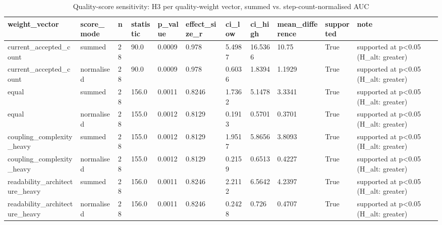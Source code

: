\begin{table}[t]
\centering
\caption{Quality-score sensitivity: H3 per quality-weight vector, summed vs. step-count-normalised AUC}
\label{tab:quality-sensitivity}
\begin{tabular}{lllllllllll}
\toprule
weight\_vector & score\_mode & n & statistic & p\_value & effect\_size\_r & ci\_low & ci\_high & mean\_difference & supported & note \\
\midrule
current\_accepted\_count & summed & 28 & 90.0 & 0.0009 & 0.978 & 5.4987 & 16.5366 & 10.75 & True & supported at p<0.05 (H\_alt: greater) \\
current\_accepted\_count & normalised & 28 & 90.0 & 0.0009 & 0.978 & 0.6036 & 1.8394 & 1.1929 & True & supported at p<0.05 (H\_alt: greater) \\
equal & summed & 28 & 156.0 & 0.0011 & 0.8246 & 1.7362 & 5.1478 & 3.3341 & True & supported at p<0.05 (H\_alt: greater) \\
equal & normalised & 28 & 155.0 & 0.0012 & 0.8129 & 0.1913 & 0.5701 & 0.3701 & True & supported at p<0.05 (H\_alt: greater) \\
coupling\_complexity\_heavy & summed & 28 & 155.0 & 0.0012 & 0.8129 & 1.9517 & 5.8656 & 3.8093 & True & supported at p<0.05 (H\_alt: greater) \\
coupling\_complexity\_heavy & normalised & 28 & 155.0 & 0.0012 & 0.8129 & 0.2159 & 0.6513 & 0.4227 & True & supported at p<0.05 (H\_alt: greater) \\
readability\_architecture\_heavy & summed & 28 & 156.0 & 0.0011 & 0.8246 & 2.2112 & 6.5642 & 4.2397 & True & supported at p<0.05 (H\_alt: greater) \\
readability\_architecture\_heavy & normalised & 28 & 156.0 & 0.0011 & 0.8246 & 0.2428 & 0.726 & 0.4707 & True & supported at p<0.05 (H\_alt: greater) \\
\bottomrule
\end{tabular}
\end{table}
